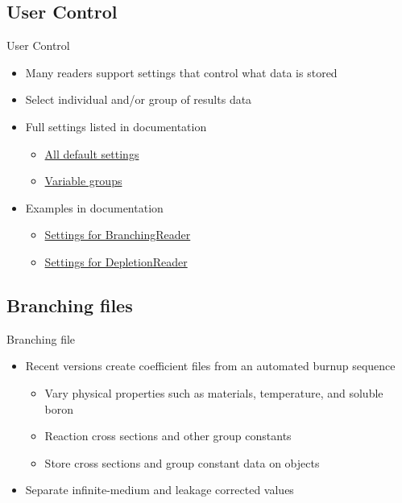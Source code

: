\subsection{User Control}
\begin{frame}{User Control}
    \begin{itemize}
        \item Many readers support settings that control what data is stored
        \item Select individual and/or group of results data
        \item Full settings listed in documentation
            \begin{itemize}
                \item \href{http://serpent-tools.readthedocs.io/en/latest/settingsTop.html\#default-settings}{All default settings}
                \item \href{http://serpent-tools.readthedocs.io/en/latest/variableGroupsTop.html}{Variable groups}
            \end{itemize}
        \item Examples in documentation
            \begin{itemize}
                \item \href{http://serpent-tools.readthedocs.io/en/latest/examples/Branching.html\#branching-settings}{Settings for BranchingReader}
                \item \href{http://serpent-tools.readthedocs.io/en/latest/examples/DepletionReader.html\#depletion-settings}{Settings for DepletionReader}
            \end{itemize}
    \end{itemize}
\end{frame}

\subsection{Branching files}
\begin{frame}{Branching file}
    \begin{itemize}
        \item Recent \sss versions create coefficient files from an automated burnup sequence 
            \begin{itemize}
                \item Vary physical properties such as materials, temperature, and soluble boron
                \item Reaction cross sections and other group constants
            \end{itemize}
        \begin{itemize}
            \item Store cross sections and group constant data on  objects
        \end{itemize}
    \item Separate infinite-medium and leakage corrected values
    \end{itemize}
\end{frame}

\backupend
